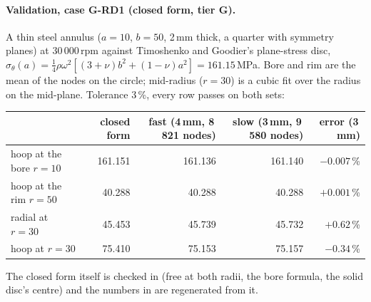 \paragraph{Validation, case G-RD1 (closed form, tier G).} A thin steel annulus ($a=10$, $b=50$, 2\,mm thick, a quarter with
symmetry planes) at 30\,000\,rpm against Timoshenko and Goodier's plane-stress disc,
$\sigma_\theta(a)=\tfrac14\rho\omega^2[(3+\nu)b^2+(1-\nu)a^2]=161.15$\,MPa. Bore and rim are the mean of the nodes on the
circle; mid-radius ($r=30$) is a cubic fit over the radius on the mid-plane. Tolerance 3\,\%, every row passes on both
sets:
\begin{center}
\small
\begin{tabular}{@{}lrrrr@{}}
\toprule
 & closed form & fast (4\,mm, 8\,821 nodes) & slow (3\,mm, 9\,580 nodes) & error (3\,mm)\\
\midrule
hoop at the bore $r=10$ & 161.151 & 161.136 & 161.140 & $-0.007$\,\%\\
hoop at the rim $r=50$ & 40.288 & 40.288 & 40.288 & $+0.001$\,\%\\
radial at $r=30$ & 45.453 & 45.739 & 45.732 & $+0.62$\,\%\\
hoop at $r=30$ & 75.410 & 75.153 & 75.157 & $-0.34$\,\%\\
\bottomrule
\end{tabular}
\end{center}
The closed form itself is checked in  (free at both radii, the bore formula, the solid disc's
centre) and the numbers in  are regenerated from it.

